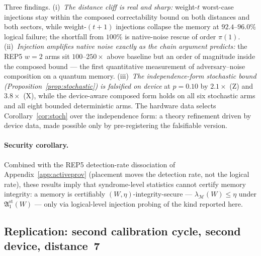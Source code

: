 \documentclass[11pt,a4paper]{article}
\begin{document}
Three findings. (i)~\emph{The distance cliff is real and sharp:}
weight-$t$ worst-case injections stay within the composed
correctability bound on both distances and both sectors, while
weight-$(t{+}1)$ injections collapse the memory at $92.4$--$96.0\%$
logical failure; the shortfall from $100\%$ is native-noise rescue of
order $\pi(1)$. (ii)~\emph{Injection amplifies native noise exactly as
the chain argument predicts:} the REP5 $w{=}2$ arms sit
$100$--$250\times$ above baseline but an order of magnitude inside the
composed bound --- the first quantitative measurement of
adversary--noise composition on a quantum memory.
(iii)~\emph{The independence-form stochastic bound
(Proposition~\ref{prop:stochastic}) is falsified on device} at
$p{=}0.10$ by $2.1\times$ (Z) and $3.8\times$ (X), while the
device-aware composed form holds on all six stochastic arms and all
eight bounded deterministic arms. The hardware data selects
Corollary~\ref{cor:stoch} over the independence form: a theory
refinement driven by device data, made possible only by pre-registering
the falsifiable version.

\paragraph{Security corollary.}
Combined with the REP5 detection-rate dissociation of
Appendix~\ref{app:activeprov} (placement moves the detection rate, not
the logical rate), these results imply that syndrome-level statistics
cannot certify memory integrity: a memory is certifiably
$(W,\eta)$-integrity-secure --- $\lambda_{\mathcal{M}}(W)\le\eta$ under
$\mathfrak{A}_1^{\mathrm{st}}(W)$ --- only via logical-level injection
probing of the kind reported here.

\subsection{Replication: second calibration cycle, second device,
distance~7}\label{app:injection-repl}
\end{document}
